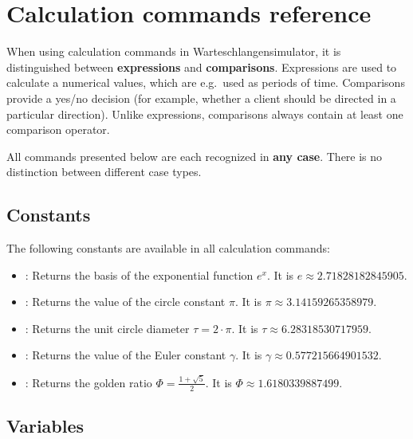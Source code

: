 \part{Calculation commands reference}\label{part:Rechenbefehle}

When using calculation commands in Warteschlangensimulator,
it is distinguished between \textbf{expressions} and \textbf{comparisons}.
Expressions are used to calculate a numerical values, which are e.g.\ used as periods of time.
Comparisons provide a yes/no decision (for example, whether a client should be directed
in a particular direction). Unlike expressions, comparisons always contain at least one comparison operator.

All commands presented below are each recognized in \textbf{any case}.
There is no distinction between different case types.



\chapter{Constants}

The following constants are available in all calculation commands:

\begin{itemize}

\item
{}: Returns the basis of the exponential function $e^x$. It is
$e\approx 2.71828182845905$.

\item
{}: Returns the value of the circle constant $\pi$. It is
$\pi\approx 3.14159265358979$.

\item
{}: Returns the unit circle diameter $\tau=2\cdot\pi$. It is
$\tau\approx 6.28318530717959$.

\item
{}: Returns the value of the Euler constant $\gamma$. It is
$\gamma\approx 0.577215664901532$.

\item
{}: Returns the golden ratio $\Phi=\frac{1+\sqrt5}{2}$. It is
$\Phi\approx1.6180339887499$.

\end{itemize}



\chapter{Variables}

